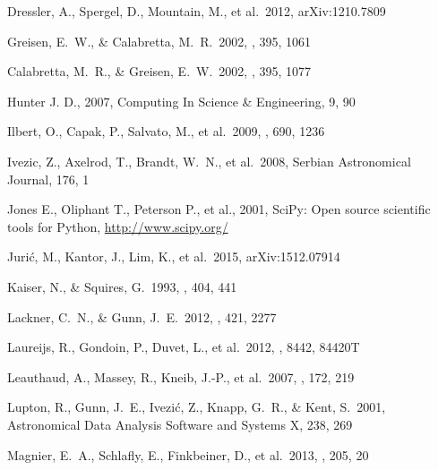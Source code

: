 \documentclass[useamsfonts]{pasj01}
\begin{document}
\begin{thebibliography}{}
     Dressler, A., Spergel, D., Mountain,
             M., et al.\ 2012, arXiv:1210.7809 

     Greisen, E.~W., \& Calabretta, M.~R.\ 
             2002, \aap, 395, 1061 
             
     Calabretta, M.~R., \& Greisen, E.~W.\ 
             2002, \aap, 395, 1077 
             
     Hunter J. D., 2007, Computing In Science \& 
             Engineering, 9, 90
             
     Ilbert, O., Capak, P., Salvato, 
             M., et al.\ 2009, \apj, 690, 1236 
    
     Ivezic, Z., Axelrod, T., Brandt, W.~N., 
             et al.\ 2008, Serbian Astronomical Journal, 176, 1 

     Jones E., Oliphant T., Peterson P., et al., 
             2001, SciPy: Open source scientific tools for Python, 
             \url{http://www.scipy.org/}
             
     Juri{\'c}, M., Kantor, J., Lim, K., 
             et al.\ 2015, arXiv:1512.07914 
                 
     Kaiser, N., \& Squires, G.\ 
             1993, \apj, 404, 441 
        
     Lackner, C.~N., \& Gunn, J.~E.\ 
             2012, \mnras, 421, 2277 
             
     Laureijs, R., Gondoin, P., Duvet, L., 
             et al.\ 2012, \procspie, 8442, 84420T    

     Leauthaud, A., Massey, R., 
             Kneib, J.-P., et al.\ 2007, \apjs, 172, 219 

     Lupton, R., Gunn, J.~E., Ivezi{\'c}, 
             Z., Knapp, G.~R., \& Kent, S.\ 2001, Astronomical Data Analysis Software 
             and Systems X, 238, 269   
               
    \bibitem[Magnier et al.(2013)]{Magnier2013} Magnier, E.~A., Schlafly, E., 
             Finkbeiner, D., et al.\ 2013, \apjs, 205, 20 
    

\end{thebibliography}
\end{document}
